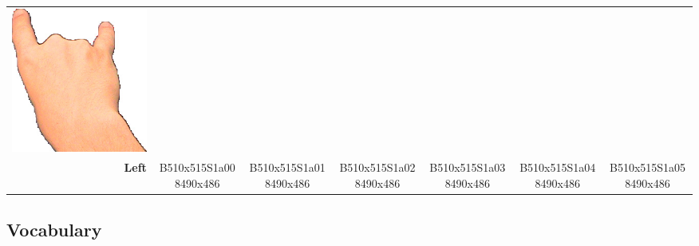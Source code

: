 \documentclass{article}
\begin{document}
\begin{center}
\begin{tabular}{r*{6}{c}}
\includegraphics[scale=0.1]{images/06-11-6.jpg}\\
\textbf{Left}&
B510x515S1a008490x486&
B510x515S1a018490x486&
B510x515S1a028490x486&
B510x515S1a038490x486&
B510x515S1a048490x486&
B510x515S1a058490x486\\
\end{tabular}
\end{center}

\subsection{Vocabulary}
\end{document}

